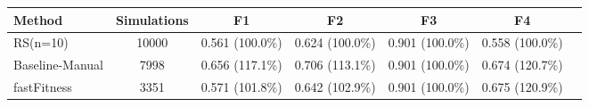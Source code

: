 \begin{tabular}{lcccccc}
\toprule
         Method &  Simulations &              F1 &              F2 &              F3 &              F4 \\
\midrule
       RS(n=10) &        10000 & 0.561 (100.0\%) & 0.624 (100.0\%) & 0.901 (100.0\%) & 0.558 (100.0\%) \\
Baseline-Manual &         7998 & 0.656 (117.1\%) & 0.706 (113.1\%) & 0.901 (100.0\%) & 0.674 (120.7\%) \\
    fastFitness &         3351 & 0.571 (101.8\%) & 0.642 (102.9\%) & 0.901 (100.0\%) & 0.675 (120.9\%) \\
\bottomrule
\end{tabular}
